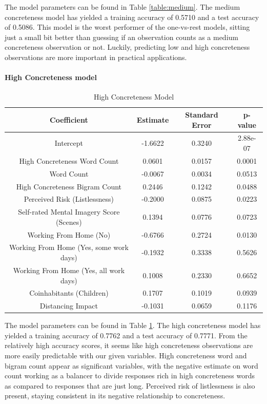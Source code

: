 \documentclass[12pt, a4paper]{article}
\begin{document}
The model parameters can be found in Table \ref{table:medium}. The medium concreteness model has yielded a training accuracy of 0.5710 and a test accuracy of 0.5086. This model is the worst performer of the one-vs-rest models, sitting just a small bit better than guessing if an observation counts as a medium concreteness observation or not. Luckily, predicting low and high concreteness observations are more important in practical applications. 

\paragraph{High Concreteness model}

\begin{table}[ht]
\centering
\begin{tabular}{||c c c c||} 
 \hline
 Coefficient & Estimate & Standard Error & p-value \\ [0.5ex] 
 \hline\hline
 Intercept & -1.6622 & 0.3240 & 2.88e-07 \\ 
 High Concreteness Word Count & 0.0601 & 0.0157 & 0.0001 \\
 Word Count & -0.0067 & 0.0034 & 0.0513 \\
 High Concreteness Bigram Count & 0.2446 & 0.1242 & 0.0488 \\
 Perceived Risk (Listlessness)  & -0.2000 & 0.0875 & 0.0223 \\ 
 Self-rated Mental Imagery Score (Scenes)  & 0.1394 & 0.0776 & 0.0723 \\ 
 Working From Home (No)  & -0.6766 & 0.2724 & 0.0130 \\ 
 Working From Home (Yes, some work days)  & -0.1932 & 0.3338 & 0.5626 \\ 
 Working From Home (Yes, all work days)  & 0.1008 & 0.2330 & 0.6652 \\ 
 Coinhabitants (Children)  & 0.1707 & 0.1019 & 0.0939 \\ 
 Distancing Impact  & -0.1031 & 0.0659 & 0.1176 \\ [1ex] 
 \hline
\end{tabular}
\caption{High Concreteness Model}
\label{table:high}
\end{table}

The model parameters can be found in Table \ref{table:high}. The high concreteness model has yielded a training accuracy of 0.7762 and a test accuracy of 0.7771. From the relatively high accuracy scores, it seems like high concreteness observations are more easily predictable with our given variables. High concreteness word and bigram count appear as significant variables, with the negative estimate on word count working as a balancer to divide responses rich in high concreteness words as compared to responses that are just long. Perceived risk of listlessness is also present, staying consistent in its negative relationship to concreteness.
\end{document}
